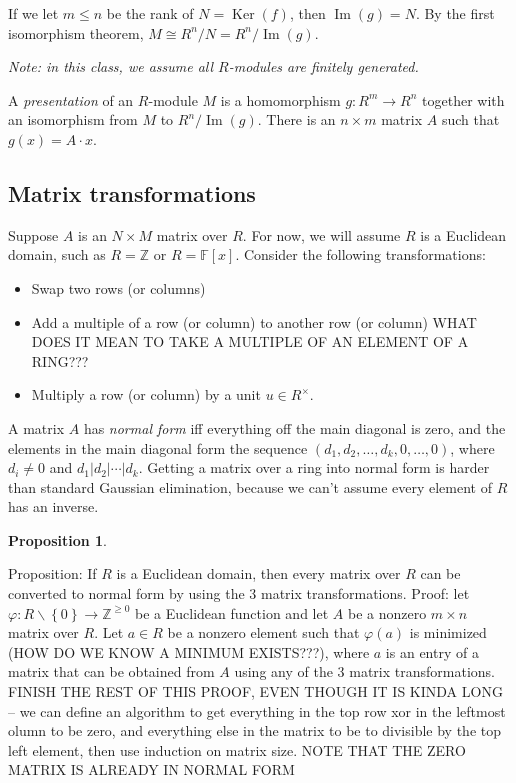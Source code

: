 \documentclass[12pt]{article}
\newtheorem{prop}[thm]{Proposition}
\begin{document}
\par
If we let $m \leq n$ be the rank of $N=\operatorname{Ker}(f)$, then $\operatorname{Im}(g)=N$. By the first isomorphism theorem, $M \cong R^n/N =R^n/\operatorname{Im}(g)$.
\par
\textit{Note: in this class, we assume all $R$-modules are finitely generated.}
\par
A \textit{presentation} of an $R$-module $M$ is a homomorphism $g: R^m \rightarrow R^n$ together with an isomorphism from $M$ to $R^n/\operatorname{Im}(g)$. There is an $n \times m$ matrix $A$ such that $g(x)=A \cdot x$.

\subsection{Matrix transformations}
Suppose $A$ is an $N \times M$ matrix over $R$. For now, we will assume $R$ is a Euclidean domain, such as $R=\mathbb{Z}$ or $R=\mathbb{F}[x]$. Consider the following transformations:
\begin{itemize}
    \item Swap two rows (or columns)
    \item Add a multiple of a row (or column) to another row (or column) WHAT DOES IT MEAN TO TAKE A MULTIPLE OF AN ELEMENT OF A RING???
    \item Multiply a row (or column) by a unit $u \in R^\times$.
\end{itemize}
A matrix $A$ has \textit{normal form} iff everything off the main diagonal is zero, and the elements in the main diagonal form the sequence $(d_1, d_2, \dots, d_k, 0, \dots, 0)$, where $d_i \neq 0$ and $d_1 | d_2 | \cdots | d_k$. Getting a matrix over a ring into normal form is harder than standard Gaussian elimination, because we can't assume every element of $R$ has an inverse.
\par
\begin{prop}
    
\end{prop}
Proposition: If $R$ is a Euclidean domain, then every matrix over $R$ can be converted to normal form by using the 3 matrix transformations. Proof: let $\varphi: R \backslash \left\{ 0 \right\} \rightarrow\mathbb{Z}^{\geq 0}$ be a Euclidean function and let $A$ be a nonzero $m \times n$ matrix over $R$. Let $a \in R$ be a nonzero element such that $\varphi(a)$ is minimized (HOW DO WE KNOW A MINIMUM EXISTS???), where $a$ is an entry of a matrix that can be obtained from $A$ using any of the 3 matrix transformations. FINISH THE REST OF THIS PROOF, EVEN THOUGH IT IS KINDA LONG -- we can define an algorithm to get everything in the top row xor in the leftmost olumn to be zero, and everything else in the matrix to be to divisible by the top left element, then use induction on matrix size. NOTE THAT THE ZERO MATRIX IS ALREADY IN NORMAL FORM
\end{document}
